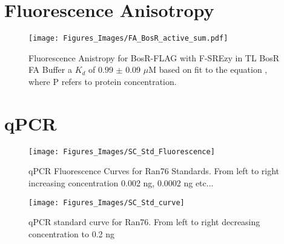 \documentclass[12pt,twoside]{reedthesis}
\begin{document}
   \section{Fluorescence Anisotropy}
           	\begin{figure}[h]
           		\centering
           		\texttt{[image: Figures\_Images/FA\_BosR\_active\_sum.pdf]}
           		\caption[Determining DNA Activity of BosR-FLAG by Fluorescence Anistropy]{Fluorescence Anistropy for BosR-FLAG with F-SREzy in TL BosR FA Buffer  a $K_{d}$ of 0.99 $\pm$ 0.09 $\mu$M based on fit to the equation \FAstdfit , where P refers to protein concentration.}
           		\label{BosRFLAGFAactive}
           	\end{figure}
           	
           	\section{qPCR}
           	
       		 \begin{figure}[h!tbp]
       		 	\centering
       		 	\texttt{[image: Figures\_Images/SC\_Std\_Fluorescence]}
       		 	\caption[qPCR Fluorescence Curves for Ran76 Standards]{qPCR Fluorescence Curves for Ran76 Standards. From left to right increasing concentration 0.002 ng, 0.0002 ng etc...}
       		 	\label{qPCRRan76Stds}
       		 \end{figure}
       		 
       		 
       		     		 \begin{figure}[h!tbp]
       		     		 	\centering
       		     		 	\texttt{[image: Figures\_Images/SC\_Std\_curve]}
       		     		 	\caption[qPCR Standard Curves for Ran76 Amplification]{qPCR standard curve for Ran76. From left to right decreasing concentration  to 0.2 ng}
       		     		 	\label{qPCRRan76Stdcurve}
       		     		 \end{figure}
           	
\end{document}
